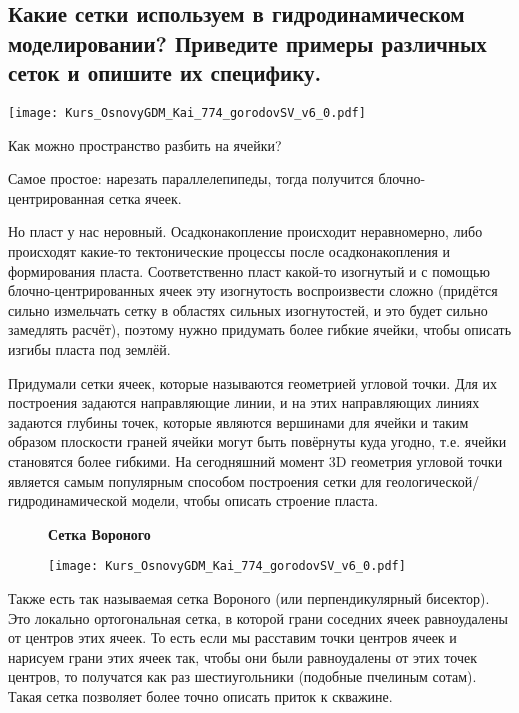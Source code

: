

\subsection{Какие сетки используем в гидродинамическом моделировании? Приведите примеры различных сеток и опишите их специфику.}

\texttt{[image: Kurs\_OsnovyGDM\_Kai\_774\_gorodovSV\_v6\_0.pdf]}

Как можно пространство разбить на ячейки?

Самое простое: нарезать параллелепипеды, тогда получится блочно-центрированная сетка ячеек.

Но пласт у нас неровный. Осадконакопление происходит неравномерно, либо происходят какие-то тектонические процессы после осадконакопления и формирования пласта.
Соответственно пласт какой-то изогнутый и с помощью блочно-центрированных ячеек эту изогнутость воспроизвести сложно (придётся сильно измельчать сетку в областях сильных изогнутостей, и это будет сильно замедлять расчёт), поэтому нужно придумать более гибкие ячейки, чтобы описать изгибы пласта под землёй.

Придумали сетки ячеек, которые называются геометрией угловой точки.
Для их построения задаются направляющие линии, и на этих направляющих линиях задаются глубины точек, которые являются вершинами для ячейки и таким образом плоскости граней ячейки могут быть повёрнуты куда угодно, т.е. ячейки становятся более гибкими.
На сегодняшний момент 3D геометрия угловой точки является самым популярным способом построения сетки для геологической/гидродинамической модели, чтобы описать строение пласта.
\\

\begin{figure}[H]
\textbf{Сетка Вороного}

\texttt{[image: Kurs\_OsnovyGDM\_Kai\_774\_gorodovSV\_v6\_0.pdf]}
\end{figure}

Также есть так называемая сетка Вороного (или перпендикулярный бисектор).
Это локально ортогональная сетка, в которой грани соседних ячеек равноудалены от центров этих ячеек.
То есть если мы расставим точки центров ячеек и нарисуем грани этих ячеек так, чтобы они были равноудалены от этих точек центров, то получатся как раз шестиугольники (подобные пчелиным сотам).
Такая сетка позволяет более точно описать приток к скважине.
\\

